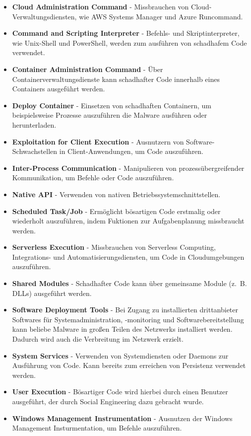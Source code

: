 \documentclass[conference]{IEEEtran}
\begin{document}
\begin{itemize}
    \item \textbf{Cloud Administration Command} - Missbrauchen von Cloud-Verwaltungsdiensten, wie AWS Systems Manager und Azure Runcommand.
    \item \textbf{Command and Scripting Interpreter} - Befehls- und Skriptinterpreter, wie Unix-Shell und PowerShell, werden zum ausführen von schadhafem Code verwendet.
    \item \textbf{Container Administration Command} - Über Containerverwaltungsdienste kann schadhafter Code innerhalb eines Containers ausgeführt werden.
    \item \textbf{Deploy Container} - Einsetzen von schadhaften Containern, um beispielsweise Prozesse auszuführen die Malware ausführen oder herunterladen.
    \item \textbf{Exploitation for Client Execution} - Ausnutzern von Software-Schwachstellen in Client-Anwendungen, um Code auszuführen.
    \item \textbf{Inter-Process Communication} - Manipulieren von prozessübergreifender Kommunikation, um Befehle oder Code auszuführen.
    \item \textbf{Native API} - Verwenden von nativen Betriebssystemschnittstellen.
    \item \textbf{Scheduled Task/Job} - Ermöglicht bösartigen Code erstmalig oder wiederholt auszuführen, indem Fuktionen zur Aufgabenplanung missbraucht werden.
    \item \textbf{Serverless Execution} - Missbrauchen von Serverless Computing, Integrations- und Automatisierungsdiensten, um Code in Cloudumgebungen auszuführen.
    \item \textbf{Shared Modules} - Schadhafter Code kann über gemeinsame Module (z.~B. DLLs) ausgeführt werden.
    \item \textbf{Software Deployment Tools} - Bei Zugang zu installierten drittanbieter Softwares für Systemadministration, -monitoring und Softwarebereitstellung kann beliebe Malware in großen Teilen des Netzwerks installiert werden. Dadurch wird auch die Verbreitung im Netzwerk erzielt.
    \item \textbf{System Services} - Verwenden von Systemdiensten oder Daemons zur Ausführung von Code. Kann bereits zum erreichen von Persistenz verwendet werden.
    \item \textbf{User Execution} - Bösartiger Code wird hierbei durch einen Benutzer ausgeführt, der durch Social Engineering dazu gebracht wurde.
    \item \textbf{Windows Management Instrumentation} - Ausnutzen der Windows Management Insturmentation, um Befehle auszuführen.
\end{itemize}
\end{document}
